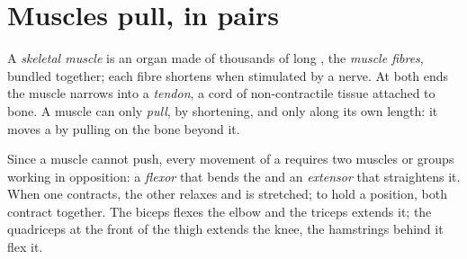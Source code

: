 \section{Muscles pull, in pairs}

\begin{definition}\label{def:g10:muscles-and-joints:muscle}
A \emph{skeletal muscle} is an organ made of
thousands of long , the \emph{muscle fibres}, bundled together;
each fibre shortens when stimulated by a nerve. At both ends the
muscle narrows into a \emph{tendon}, a cord of
non-contractile tissue attached to bone. A muscle can only
\emph{pull}, by shortening, and only along its own length: it moves a
 by pulling on the bone beyond it.
\end{definition}

\begin{proposition}\label{prop:g10:muscles-and-joints:antagonists}
Since a muscle cannot push, every movement of a  requires two
muscles or groups working in opposition: a \emph{flexor} that bends
the  and an \emph{extensor} that straightens it. When one
contracts, the other relaxes and is stretched; to hold a position,
both contract together. The biceps flexes the elbow and the triceps
extends it; the quadriceps at the front of the thigh extends the knee,
the hamstrings behind it flex it.
\end{proposition}
\admitted

